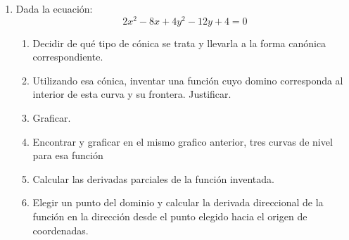 \documentclass[12pt]{article}
\theoremstyle{definition}
\begin{document}
\begin{enumerate}
\item  
Dada la ecuación:
\begin{equation*}
2x^2- 8x+4y^2-12y+4=0
\end{equation*} 
\begin{enumerate}
\item Decidir de qué tipo de cónica se trata y llevarla a la forma canónica correspondiente.
\item Utilizando esa cónica, inventar una función cuyo domino corresponda al interior de esta curva y su frontera. Justificar.
\item Graficar.
\item Encontrar y graficar en el mismo grafico anterior, tres curvas de nivel para esa función
\item Calcular las derivadas parciales de la función inventada.
\item Elegir un punto del dominio y calcular  la derivada direccional de la función en la dirección desde el punto elegido hacia el origen de coordenadas.
\end{enumerate}

\end{enumerate}
\end{document}
